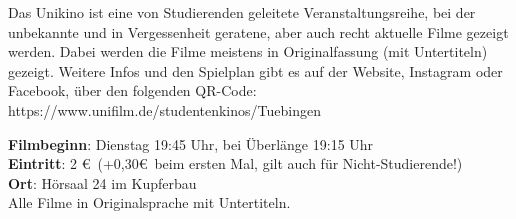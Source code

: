 Das Unikino ist eine von Studierenden geleitete Veranstaltungsreihe, bei der
unbekannte und in Vergessenheit geratene, aber auch recht aktuelle Filme
gezeigt werden. Dabei werden die Filme meistens in Originalfassung (mit
Untertiteln) gezeigt. Weitere Infos und den Spielplan gibt es auf der Website, 
Instagram oder Facebook, über den folgenden QR-Code:
\\





\scriptsize{https://www.unifilm.de/studentenkinos/Tuebingen}



\textbf{Filmbeginn}: Dienstag 19:45 Uhr, bei Überlänge 19:15 Uhr\\
\textbf{Eintritt}: 2 \euro ~(+0,30\euro \ beim ersten Mal, gilt auch für Nicht-Studierende!)\\
\textbf{Ort}: Hörsaal 24 im Kupferbau\\
Alle Filme in Originalsprache mit Untertiteln.


